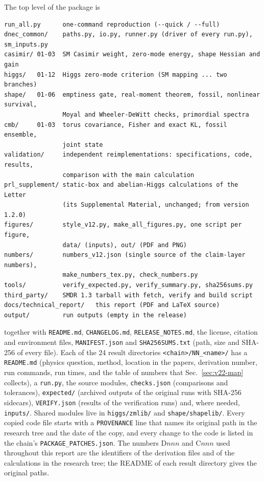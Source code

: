 The top level of the package is
{\small
\begin{verbatim}
run_all.py      one-command reproduction (--quick / --full)
dnec_common/    paths.py, io.py, runner.py (driver of every run.py), sm_inputs.py
casimir/ 01-03  SM Casimir weight, zero-mode energy, shape Hessian and gain
higgs/   01-12  Higgs zero-mode criterion (SM mapping ... two branches)
shape/   01-06  emptiness gate, real-moment theorem, fossil, nonlinear survival,
                Moyal and Wheeler-DeWitt checks, primordial spectra
cmb/     01-03  torus covariance, Fisher and exact KL, fossil ensemble,
                joint state
validation/     independent reimplementations: specifications, code, results,
                comparison with the main calculation
prl_supplement/ static-box and abelian-Higgs calculations of the Letter
                (its Supplemental Material, unchanged; from version 1.2.0)
figures/        style_v12.py, make_all_figures.py, one script per figure,
                data/ (inputs), out/ (PDF and PNG)
numbers/        numbers_v12.json (single source of the claim-layer numbers),
                make_numbers_tex.py, check_numbers.py
tools/          verify_expected.py, verify_summary.py, sha256sums.py
third_party/    SMDR 1.3 tarball with fetch, verify and build script
docs/technical_report/   this report (PDF and LaTeX source)
output/         run outputs (empty in the release)
\end{verbatim}}
together with \texttt{README.md}, \texttt{CHANGELOG.md}, \texttt{RELEASE\_NOTES.md}, the license, citation and environment files, \texttt{MANIFEST.json} and \texttt{SHA256SUMS.txt} (path, size and SHA-256 of every file).
Each of the 24 result directories \texttt{<chain>/NN\_<name>/} has a \texttt{README.md} (physics question, method, location in the papers, derivation number, run commands, run times, and the table of numbers that Sec.~\ref{sec:v22-map} collects), a \texttt{run.py}, the source modules, \texttt{checks.json} (comparisons and tolerances), \texttt{expected/} (archived outputs of the original runs with SHA-256 sidecars), \texttt{VERIFY.json} (results of the verification runs) and, where needed, \texttt{inputs/}.
Shared modules live in \texttt{higgs/zmlib/} and \texttt{shape/shapelib/}.
Every copied code file starts with a \texttt{PROVENANCE} line that names its original path in the research tree and the date of the copy, and every change to the code is listed in the chain's \texttt{PACKAGE\_PATCHES.json}.
The numbers D$nnn$ and C$nnn$ used throughout this report are the identifiers of the derivation files and of the calculations in the research tree; the README of each result directory gives the original paths.

